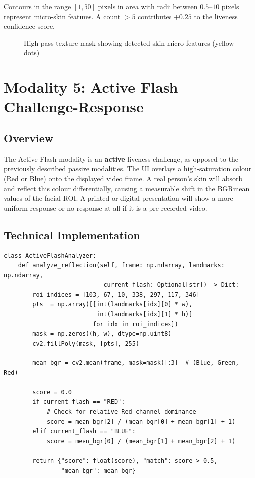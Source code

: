 \documentclass[12pt,a4paper]{report}
\begin{document}
Contours in the range $[1, 60]$ pixels in area with radii between $0.5$--$10$ pixels represent micro-skin features. A count $> 5$ contributes $+0.25$ to the liveness confidence score.

\begin{figure}[H]
    \centering
    \caption{High-pass texture mask showing detected skin micro-features (yellow dots)}
    \label{fig:texture}
\end{figure}

\chapter{Modality 5: Active Flash Challenge-Response}

\section{Overview}
The Active Flash modality is an \textbf{active} liveness challenge, as opposed to the previously described passive modalities. The UI overlays a high-saturation colour (Red or Blue) onto the displayed video frame. A real person's skin will absorb and reflect this colour differentially, causing a measurable shift in the BGRmean values of the facial ROI. A printed or digital presentation will show a more uniform response or no response at all if it is a pre-recorded video.

\section{Technical Implementation}

\begin{lstlisting}[style=pythonstyle, caption={Active Flash Reflection Analysis --- Active\_Flash\_Modality.py}]
class ActiveFlashAnalyzer:
    def analyze_reflection(self, frame: np.ndarray, landmarks: np.ndarray,
                            current_flash: Optional[str]) -> Dict:
        roi_indices = [103, 67, 10, 338, 297, 117, 346]
        pts  = np.array([[int(landmarks[idx][0] * w),
                          int(landmarks[idx][1] * h)]
                         for idx in roi_indices])
        mask = np.zeros((h, w), dtype=np.uint8)
        cv2.fillPoly(mask, [pts], 255)

        mean_bgr = cv2.mean(frame, mask=mask)[:3]  # (Blue, Green, Red)

        score = 0.0
        if current_flash == "RED":
            # Check for relative Red channel dominance
            score = mean_bgr[2] / (mean_bgr[0] + mean_bgr[1] + 1)
        elif current_flash == "BLUE":
            score = mean_bgr[0] / (mean_bgr[1] + mean_bgr[2] + 1)

        return {"score": float(score), "match": score > 0.5,
                "mean_bgr": mean_bgr}
\end{lstlisting}
\end{document}
